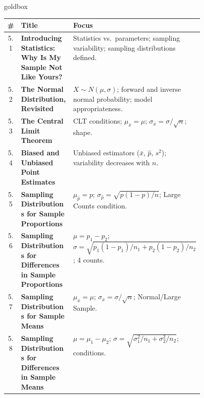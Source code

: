 \documentclass[10pt]{article}
\begin{document}
\renewcommand{\arraystretch}{1.6}
\begin{skillbox}{goldbox}
\begin{tabularx}{\linewidth}{@{} c >{\bfseries}p{0.46\linewidth} X @{}}
  \textbf{\#} & \textbf{Title} & \textbf{Focus} \\
  \hline
  5.1 & Introducing Statistics: Why Is My Sample Not Like Yours?
      & Statistics vs.\ parameters; sampling variability; sampling distributions defined. \\
  \hline
  5.2 & The Normal Distribution, Revisited
      & $X \sim N(\mu,\sigma)$; forward and inverse normal probability; model appropriateness. \\
  \hline
  5.3 & The Central Limit Theorem
      & CLT conditions; $\mu_{\bar{x}} = \mu$; $\sigma_{\bar{x}} = \sigma/\sqrt{n}$; shape. \\
  \hline
  5.4 & Biased and Unbiased Point Estimates
      & Unbiased estimators ($\bar{x}$, $\hat{p}$, $s^2$); variability decreases with $n$. \\
  \hline
  5.5 & Sampling Distributions for Sample Proportions
      & $\mu_{\hat{p}} = p$; $\sigma_{\hat{p}} = \sqrt{p(1{-}p)/n}$; Large Counts condition. \\
  \hline
  5.6 & Sampling Distributions for Differences in Sample Proportions
      & $\mu = p_1{-}p_2$; $\sigma = \sqrt{p_1(1{-}p_1)/n_1 + p_2(1{-}p_2)/n_2}$; 4 counts. \\
  \hline
  5.7 & Sampling Distributions for Sample Means
      & $\mu_{\bar{x}} = \mu$; $\sigma_{\bar{x}} = \sigma/\sqrt{n}$; Normal/Large Sample. \\
  \hline
  5.8 & Sampling Distributions for Differences in Sample Means
      & $\mu = \mu_1{-}\mu_2$; $\sigma = \sqrt{\sigma_1^2/n_1 + \sigma_2^2/n_2}$; conditions. \\
  \hline
\end{tabularx}
\end{skillbox}

\vspace{0.18in}
\end{document}
